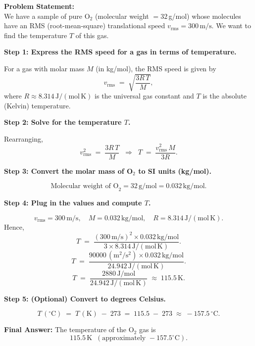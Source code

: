 \documentclass[12pt]{article}
\theoremstyle{definition} %
\theoremstyle{plain} %
\begin{document}
\noindent
\textbf{Problem Statement:} \\
We have a sample of pure O$_2$ (molecular weight $= 32\,$g/mol) whose molecules have an RMS (root-mean-square) translational speed $v_\mathrm{rms} = 300\,\mathrm{m/s}$. We want to find the temperature $T$ of this gas.

\vspace{1em}
\noindent
\textbf{Step 1: Express the RMS speed for a gas in terms of temperature.}

For a gas with molar mass $M$ (in kg/mol), the RMS speed is given by
\[
v_\mathrm{rms} \;=\; \sqrt{\frac{3 R \, T}{M}},
\]
where $R \approx 8.314\,\mathrm{J/(mol\,K)}$ is the universal gas constant and $T$ is the absolute (Kelvin) temperature.

\vspace{1em}
\noindent
\textbf{Step 2: Solve for the temperature $T$.}

Rearranging,
\[
v_\mathrm{rms}^2 
\;=\;
\frac{3 R \, T}{M}
\;\;\Longrightarrow\;\;
T
\;=\;
\frac{v_\mathrm{rms}^2\,M}{3 R}.
\]

\vspace{1em}
\noindent
\textbf{Step 3: Convert the molar mass of O$_2$ to SI units (kg/mol).}

\[
\text{Molecular weight of O}_2 = 32\,\mathrm{g/mol} 
= 0.032\,\mathrm{kg/mol}.
\]

\vspace{1em}
\noindent
\textbf{Step 4: Plug in the values and compute $T$.}

\[
v_\mathrm{rms} = 300\,\mathrm{m/s}, 
\quad
M = 0.032\,\mathrm{kg/mol}, 
\quad
R = 8.314\,\mathrm{J/(mol\,K)}.
\]
Hence,
\[
T 
\;=\;
\frac{(300\,\mathrm{m/s})^2 \times 0.032\,\mathrm{kg/mol}}{3 \times 8.314\,\mathrm{J/(mol\,K)}}.
\]
\[
T 
\;=\; 
\frac{90000\,(\mathrm{m^2/s^2}) \times 0.032\,\mathrm{kg/mol}}{24.942\,\mathrm{J/(mol\,K)}}.
\]
\[
T 
\;=\;
\frac{2880\,\mathrm{J/mol}}{24.942\,\mathrm{J/(mol\,K)}}
\;\approx\;
115.5\,\mathrm{K}.
\]

\vspace{1em}
\noindent
\textbf{Step 5: (Optional) Convert to degrees Celsius.}

\[
T\,(\!^\circ\mathrm{C})
\;=\;
T\,(\mathrm{K}) \;-\; 273
\;=\;
115.5 \;-\; 273
\;\approx\;
-157.5\,^\circ\mathrm{C}.
\]

\vspace{1em}
\noindent
\textbf{Final Answer:} 
The temperature of the O$_2$ gas is 
\[
\boxed{115.5\,\mathrm{K} \;\;(\text{approximately }-157.5^\circ\mathrm{C}).}
\]
\end{document}
